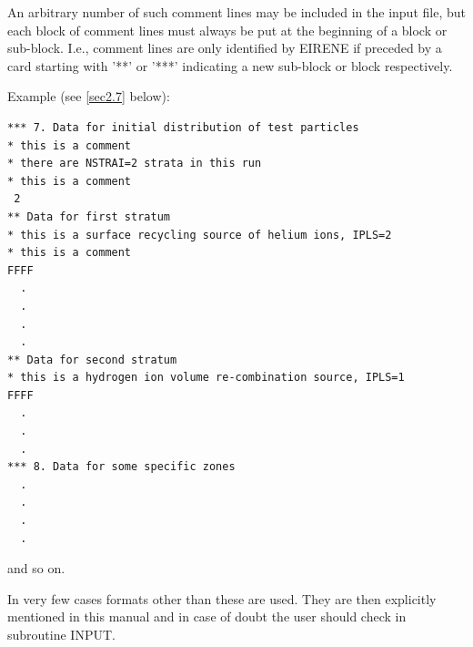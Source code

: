 An arbitrary number of such comment lines may be included in the input file,
but each block of comment lines must always be put at the beginning of a block
or sub-block.
I.e., comment lines are only identified by EIRENE if preceded by a card
starting with '**' or '***' indicating a new sub-block or block respectively.

\medskip

Example (see \cref{sec2.7} below):

\begin{lstlisting}
*** 7. Data for initial distribution of test particles
* this is a comment
* there are NSTRAI=2 strata in this run
* this is a comment
 2
** Data for first stratum
* this is a surface recycling source of helium ions, IPLS=2
* this is a comment
FFFF
  .
  .
  .
  .
** Data for second stratum
* this is a hydrogen ion volume re-combination source, IPLS=1
FFFF
  .
  .
  .
*** 8. Data for some specific zones
  .
  .
  .
  .
\end{lstlisting}

and so on.

\medskip

In very few cases formats other than these are used.
They are then explicitly mentioned in this manual and in case of doubt the user
should check in subroutine INPUT.
